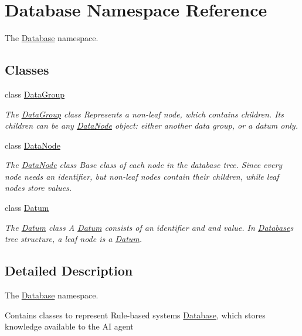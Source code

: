 \hypertarget{namespaceDatabase}{}\section{Database Namespace Reference}
\label{namespaceDatabase}


The \hyperlink{namespaceDatabase}{Database} namespace.  


\subsection*{Classes}
\begin{DoxyCompactItemize}
\item 
class \hyperlink{classDatabase_1_1DataGroup}{Data\+Group}
\begin{DoxyCompactList}\small\item\em The \hyperlink{classDatabase_1_1DataGroup}{Data\+Group} class Represents a non-\/leaf node, which contains children. Its children can be any \hyperlink{classDatabase_1_1DataNode}{Data\+Node} object\+: either another data group, or a datum only. \end{DoxyCompactList}\item 
class \hyperlink{classDatabase_1_1DataNode}{Data\+Node}
\begin{DoxyCompactList}\small\item\em The \hyperlink{classDatabase_1_1DataNode}{Data\+Node} class Base class of each node in the database tree. Since every node needs an identifier, but non-\/leaf nodes contain their children, while leaf nodes store values. \end{DoxyCompactList}\item 
class \hyperlink{classDatabase_1_1Datum}{Datum}
\begin{DoxyCompactList}\small\item\em The \hyperlink{classDatabase_1_1Datum}{Datum} class A \hyperlink{classDatabase_1_1Datum}{Datum} consists of an identifier and and value. In \hyperlink{namespaceDatabase}{Database}\textquotesingle{}s tree structure, a leaf node is a \hyperlink{classDatabase_1_1Datum}{Datum}. \end{DoxyCompactList}\end{DoxyCompactItemize}


\subsection{Detailed Description}
The \hyperlink{namespaceDatabase}{Database} namespace. 

Contains classes to represent Rule-\/based system\textquotesingle{}s \hyperlink{namespaceDatabase}{Database}, which stores knowledge available to the AI agent 